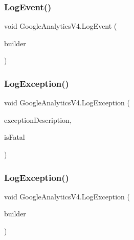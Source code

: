 \mbox{\label{class_google_analytics_v4_a1166a346068b06b75effe702b1f8bf7c}} 
\subsubsection{\texorpdfstring{Log\+Event()}{LogEvent()}\hspace{0.1cm}{\footnotesize\ttfamily [2/2]}}
{\footnotesize\ttfamily void Google\+Analytics\+V4.\+Log\+Event (\begin{DoxyParamCaption}\item[{\hyperlink{class_event_hit_builder}{Event\+Hit\+Builder}}]{builder }\end{DoxyParamCaption})}

\mbox{\label{class_google_analytics_v4_ac8b9366bae403679252396d526cf2b75}} 
\subsubsection{\texorpdfstring{Log\+Exception()}{LogException()}\hspace{0.1cm}{\footnotesize\ttfamily [1/2]}}
{\footnotesize\ttfamily void Google\+Analytics\+V4.\+Log\+Exception (\begin{DoxyParamCaption}\item[{string}]{exception\+Description,  }\item[{bool}]{is\+Fatal }\end{DoxyParamCaption})}

\mbox{\label{class_google_analytics_v4_aa31323ed1960904bf4d224e5802bef3b}} 
\subsubsection{\texorpdfstring{Log\+Exception()}{LogException()}\hspace{0.1cm}{\footnotesize\ttfamily [2/2]}}
{\footnotesize\ttfamily void Google\+Analytics\+V4.\+Log\+Exception (\begin{DoxyParamCaption}\item[{\hyperlink{class_exception_hit_builder}{Exception\+Hit\+Builder}}]{builder }\end{DoxyParamCaption})}

